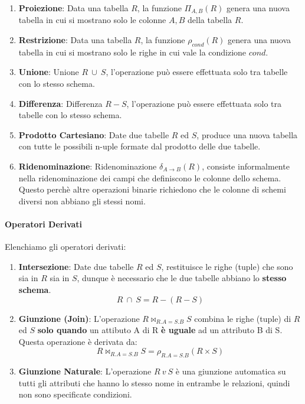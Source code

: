 \documentclass{article}
\begin{document}
\begin{enumerate}
    \item \textbf{Proiezione}: Data una tabella $R$, la funzione $\Pi_{A,B}(R)$ genera una nuova tabella in cui si mostrano solo le colonne $A,B$ della tabella $R$.
    \item \textbf{Restrizione}: Data una tabella $R$, la funzione $\rho_{cond}(R)$ genera una nuova tabella in cui si mostrano solo le righe in cui vale la condizione $cond$.
    \item \textbf{Unione}: Unione $R \: \cup \: S$, l'operazione può essere effettuata solo tra tabelle con lo stesso schema.
    \item \textbf{Differenza}: Differenza $R - S$, l'operazione può essere effettuata solo tra tabelle con lo stesso schema.
    \item \textbf{Prodotto Cartesiano}: Date due tabelle $R$ ed $S$, produce una nuova tabella con tutte le possibili n-uple formate dal prodotto delle due tabelle.
    \item \textbf{Ridenominazione}: Ridenominazione $\delta_{A \rightarrow B}(R)$, consiste informalmente nella ridenominazione dei campi che definiscono le colonne dello schema. Questo perchè altre operazioni binarie richiedono che le colonne di schemi diversi non abbiano gli stessi nomi.
\end{enumerate}

\paragraph{Operatori Derivati} Elenchiamo gli operatori derivati:

\begin{enumerate}
    \item \textbf{Intersezione}: Date due tabelle $R$ ed $S$, restituisce le righe (tuple) che sono sia in $R$ sia in $S$, dunque è necessario che le due tabelle abbiano lo \textbf{stesso schema}.
    \[ R \: \cap \: S = R - (R - S) \]
    \item \textbf{Giunzione (Join)}: L'operazione $R \bowtie_{R.A = S.B} S$ combina le righe (tuple) di $R$ ed $S$ \textbf{solo quando} un attibuto A di R \textbf{è uguale} ad un attributo B di S. Questa operazione è derivata da:
    \[ R \bowtie_{R.A = S.B} S = \rho_{R.A = S.B} (R \times S) \]
    \newpage
    \item \textbf{Giunzione Naturale}: L'operazione $R \:v\: S$ è una giunzione automatica su tutti gli attributi che hanno lo stesso nome in entrambe le relazioni, quindi non sono specificate condizioni.
\end{enumerate}
\end{document}
